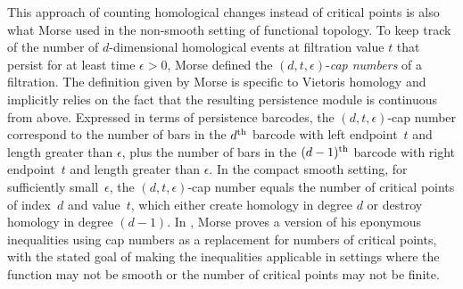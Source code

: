 This approach of counting homological changes instead of critical points is also what Morse used in the non-smooth setting of functional topology.
To keep track of the number of $d$-dimensional homological events at filtration value $t$ that persist for at least time $\epsilon > 0$, Morse \cite{Morse.1940} defined the $(d, t, \epsilon)$-\emph{cap numbers} of a filtration.
The definition given by Morse is specific to Vietoris homology and implicitly relies on the fact that the resulting persistence module is continuous from above.
Expressed in terms of persistence barcodes, the $(d, t, \epsilon)$-cap number correspond to the number of bars in the $d^{\mathrm{th}}$ barcode with left endpoint~$t$ and length greater than $\epsilon$, plus the number of bars in the $(d-1)^{\mathrm{th}}$ barcode with right endpoint~$t$ and length greater than $\epsilon$.
In the compact smooth setting, for sufficiently small~$\epsilon$, the $(d, t, \epsilon)$-cap number equals the number of critical points of index~$d$ and value~$t$, which either create homology in degree $d$ or destroy homology in degree $(d-1)$.
In \cite[Corollary~12.3]{Morse.1940}, Morse proves a version of his eponymous inequalities using cap numbers as a replacement for numbers of critical points, with the stated goal of making the inequalities applicable in settings where the function may not be smooth or the number of critical points may not be finite.

